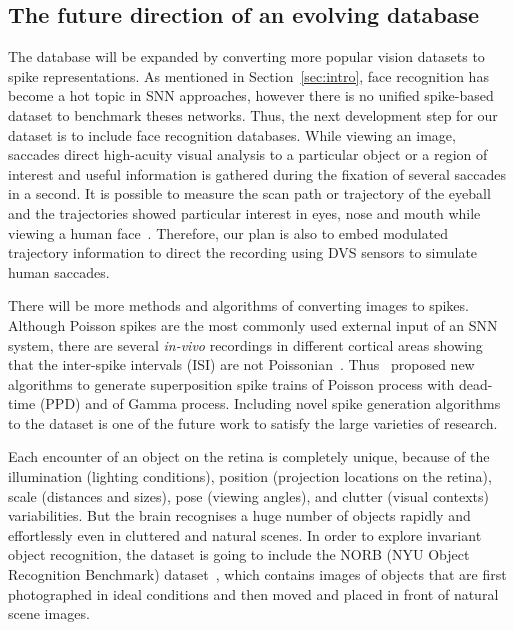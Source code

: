 \documentclass{frontiersENG} %
\begin{document}
\subsection{The future direction of an evolving database}
The database will be expanded by converting more popular vision datasets to spike representations.
As mentioned in Section~\ref{sec:intro}, face recognition has become a hot topic in SNN approaches, however there is no unified spike-based dataset to benchmark theses networks.
Thus, the next development step for our dataset is to include face recognition databases.
While viewing an image,  saccades direct high-acuity visual analysis to a particular object or a region of interest and useful information is gathered during the fixation of several saccades in a second.
It is possible to measure the scan path or trajectory of the eyeball and the trajectories showed particular interest in eyes, nose and mouth while viewing a human face~\citep{yarbus1967eye}.
Therefore, our plan is also to embed modulated trajectory information to direct the recording using DVS sensors to simulate human saccades.

There will be more methods and algorithms of converting images to spikes.
Although Poisson spikes are the most commonly used external input of an SNN system, there are several \textit{in-vivo} recordings in different cortical areas showing that the inter-spike intervals (ISI) are not Poissonian~\citep{deger2012statistical}. 
Thus~\citet{deger2012statistical} proposed new algorithms to generate superposition spike trains of Poisson process with dead-time (PPD) and of Gamma process.
Including novel spike generation algorithms to the dataset is one of the future work to satisfy the large varieties of research.

Each encounter of an object on the retina is completely unique, because of the illumination (lighting conditions), position (projection locations on the retina), scale (distances and sizes), pose (viewing angles), and clutter (visual contexts) variabilities.
But the brain recognises a huge number of objects rapidly and effortlessly even in cluttered and natural scenes.
In order to explore invariant object recognition, the dataset is going to include the NORB (NYU Object Recognition Benchmark) dataset~\citep{lecun2004learning}, which contains images of objects that are first photographed in ideal conditions and then moved and placed in front of natural scene images.
\end{document}
